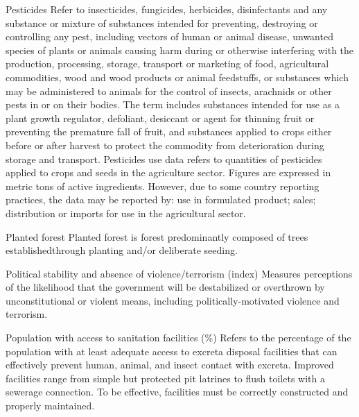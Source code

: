 \begin{MetadataCollection} {}
\begin{metadata}{Pesticides} {}
Refer to insecticides, fungicides, herbicides, disinfectants and any substance or mixture of substances intended for preventing, destroying or controlling any pest, including vectors of human or animal disease, unwanted species of plants or animals causing harm during or otherwise interfering with the production, processing, storage, transport or marketing of food, agricultural commodities, wood and wood products or animal feedstuffs, or substances which may be administered to animals for the control of insects, arachnids or other pests in or on their bodies. The term includes substances intended for use as a plant growth regulator, defoliant, desiccant or agent for thinning fruit or preventing the premature fall of fruit, and substances applied to crops either before or after harvest to protect the commodity from deterioration during storage and transport. Pesticides use data refers to quantities of pesticides applied to crops and seeds in the agriculture sector. Figures are expressed in metric tons of active ingredients. However, due to some country reporting practices, the data may be reported by: use in formulated product; sales; distribution or imports for use in the agricultural sector. 
\end{metadata}

\begin{metadata}{Planted forest} {}
Planted forest is forest predominantly composed of trees establishedthrough planting and/or deliberate seeding.
\end{metadata}

\begin{metadata}{Political stability and absence of violence/terrorism (index)} {}
Measures perceptions of the likelihood that the government will be destabilized or overthrown by unconstitutional or violent means, including politically-motivated violence and terrorism.
\end{metadata}

\begin{metadata}{Population with access to sanitation facilities (\%)} {}
Refers to the percentage of the population with at least adequate access to excreta disposal facilities that can effectively prevent human, animal, and insect contact with excreta. Improved facilities range from simple but protected pit latrines to flush toilets with a sewerage connection. To be effective, facilities must be correctly constructed and properly maintained.
\end{metadata}


\end{MetadataCollection}
